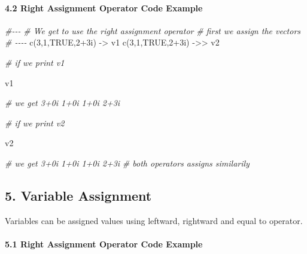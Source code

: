 \documentclass[
]{article}
\newenvironment{Shaded}{\begin{snugshade}}{\end{snugshade}}
\newcommand{\CommentTok}[1]{\textcolor[rgb]{0.56,0.35,0.01}{\textit{#1}}}
\newcommand{\ConstantTok}[1]{\textcolor[rgb]{0.00,0.00,0.00}{#1}}
\newcommand{\DecValTok}[1]{\textcolor[rgb]{0.00,0.00,0.81}{#1}}
\newcommand{\FunctionTok}[1]{\textcolor[rgb]{0.00,0.00,0.00}{#1}}
\newcommand{\NormalTok}[1]{#1}
\newcommand{\OtherTok}[1]{\textcolor[rgb]{0.56,0.35,0.01}{#1}}
\newcommand{\SpecialCharTok}[1]{\textcolor[rgb]{0.00,0.00,0.00}{#1}}
\begin{document}
\hypertarget{right-assignment-operator-code-example}{%
\paragraph{4.2 Right Assignment Operator Code
Example}\label{right-assignment-operator-code-example}}

\begin{Shaded}
\begin{Highlighting}[]

\CommentTok{\#{-}{-}{-}}
\CommentTok{\# We get to use the right assignment operator}
\CommentTok{\# first we assign the vectors}
\CommentTok{\# {-}{-}{-}{-}}
\FunctionTok{c}\NormalTok{(}\DecValTok{3}\NormalTok{,}\DecValTok{1}\NormalTok{,}\ConstantTok{TRUE}\NormalTok{,}\DecValTok{2}\SpecialCharTok{+}\NormalTok{3i) }\OtherTok{{-}\textgreater{}}\NormalTok{ v1 }
\FunctionTok{c}\NormalTok{(}\DecValTok{3}\NormalTok{,}\DecValTok{1}\NormalTok{,}\ConstantTok{TRUE}\NormalTok{,}\DecValTok{2}\SpecialCharTok{+}\NormalTok{3i) }\OtherTok{{-}\textgreater{}\textgreater{}}\NormalTok{ v2 }

\CommentTok{\# if we print v1}

\NormalTok{v1}

\CommentTok{\# we get 3+0i 1+0i 1+0i 2+3i}

\CommentTok{\# if we print v2}

\NormalTok{v2}

\CommentTok{\# we get 3+0i 1+0i 1+0i 2+3i}
\CommentTok{\# both operators assigns similarily}
\end{Highlighting}
\end{Shaded}

\hypertarget{variable-assignment}{%
\subsection{5. Variable Assignment}\label{variable-assignment}}

Variables can be assigned values using leftward, rightward and equal to
operator.

\hypertarget{right-assignment-operator-code-example-1}{%
\paragraph{5.1 Right Assignment Operator Code
Example}\label{right-assignment-operator-code-example-1}}
\end{document}
